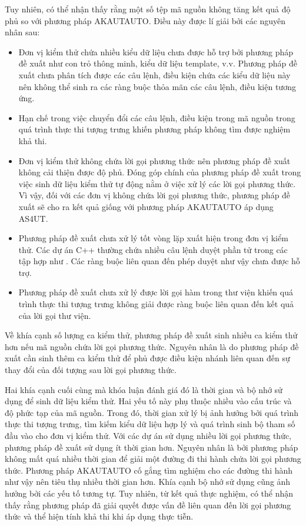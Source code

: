 Tuy nhiên, có thể nhận thấy rằng một số tệp mã nguồn không tăng kết quả độ phủ so với phương pháp AKAUTAUTO. Điều này được lí giải bởi các nguyên nhân sau:
\begin{itemize}
    \item Đơn vị kiểm thử chứa nhiều kiểu dữ liệu chưa được hỗ trợ bởi phương pháp đề xuất như con trỏ thông minh, kiểu dữ liệu template, v.v. Phương pháp đề xuất chưa phân tích được các câu lệnh, điều kiện chứa các kiểu dữ liệu này nên không thể sinh ra các ràng buộc thỏa mãn các câu lệnh, điều kiện tương ứng.
    
    \item Hạn chế trong việc chuyển đổi các câu lệnh, điều kiện trong mã nguồn trong quá trình thực thi tượng trưng khiến phương pháp không tìm được nghiệm khả thi.
    
    \item Đơn vị kiểm thử không chứa lời gọi phương thức nên phương pháp đề xuất không cải thiện được độ phủ. Đóng góp chính của phương pháp đề xuất trong việc sinh dữ liệu kiểm thử tự động nằm ở việc xử lý các lời gọi phương thức. Vì vậy, đối với các đơn vị không chứa lời gọi phương thức, phương pháp đề xuất sẽ cho ra kết quả giống với phương pháp AKAUTAUTO áp dụng AS4UT.
    
    \item Phương pháp đề xuất chưa xử lý tốt vòng lặp xuất hiện trong đơn vị kiểm thử. Các dự án C++ thường chứa nhiều câu lệnh duyệt phần tử trong các tập hợp như . Các ràng buộc liên quan đến phép duyệt như vậy chưa được hỗ trợ.
    
    \item Phương pháp đề xuất chưa xử lý được lời gọi hàm trong thư viện khiến quá trình thực thi tượng trưng không giải được ràng buộc liên quan đến kết quả của lời gọi thư viện.
\end{itemize}

Về khía cạnh số lượng ca kiểm thử, phương pháp đề xuất sinh nhiều ca kiểm thử hơn nếu mã nguồn chứa lời gọi phương thức. Nguyên nhân là do phương pháp đề xuất cần sinh thêm ca kiểm thử để phủ được điều kiện nhánh liên quan đến sự thay đổi của đối tượng sau lời gọi phương thức.

Hai khía cạnh cuối cùng mà khóa luận đánh giá đó là thời gian và bộ nhớ sử dụng để sinh dữ liệu kiểm thử. Hai yếu tố này phụ thuộc nhiều vào cấu trúc và độ phức tạp của mã nguồn. Trong đó, thời gian xử lý bị ảnh hưởng bởi quá trình thực thi tượng trưng, tìm kiếm kiểu dữ liệu hợp lý và quá trình sinh bộ tham số đầu vào cho đơn vị kiểm thử. Với các dự án sử dụng nhiều lời gọi phương thức, phương pháp đề xuất sử dụng ít thời gian hơn. Nguyên nhân là bởi phương pháp không mất quá nhiều thời gian để giải một đường đi thi hành chứa lời gọi phương thức. Phương pháp AKAUTAUTO cố gắng tìm nghiệm cho các đường thi hành như vậy nên tiêu thụ nhiều thời gian hơn. Khía cạnh bộ nhớ sử dụng cũng ảnh hưởng bởi các yếu tố tương tự. Tuy nhiên, từ kết quả thực nghiệm, có thể nhận thấy rằng phương pháp đã giải quyết được vấn đề liên quan đến lời gọi phương thức và thể hiện tính khả thi khi áp dụng thực tiễn.
